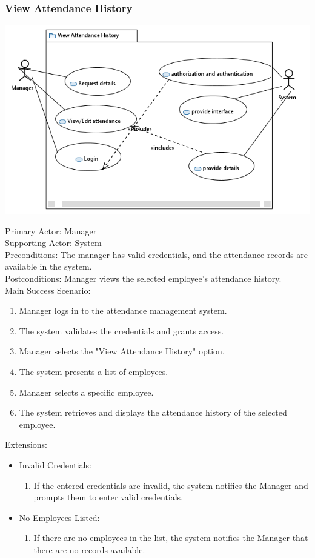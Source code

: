 \documentclass[a4paper, 12pt]{article}
\begin{document}
\subsubsection{View Attendance History}
\begin{center}
\includegraphics[width=1\textwidth]{View_Attendance_History_Use_Case.PNG}\par
\end{center}
Primary Actor: Manager\\
Supporting Actor: System\\
Preconditions: The manager has valid credentials, and the attendance records are available in the system.\\
Postconditions: Manager views the selected employee's attendance history.\\
\newpage
Main Success Scenario:
\begin{enumerate}
    \item Manager logs in to the attendance management system.
    \item The system validates the credentials and grants access.
    \item Manager selects the "View Attendance History" option.
    \item The system presents a list of employees.
    \item Manager selects a specific employee.
    \item The system retrieves and displays the attendance history of the selected employee.
\end{enumerate}
Extensions:
\begin{itemize}
    \item Invalid Credentials:
    \begin{enumerate}
        \item If the entered credentials are invalid, the system notifies the Manager and prompts them to enter valid credentials.
    \end{enumerate}
    \item No Employees Listed:
    \begin{enumerate}
        \item If there are no employees in the list, the system notifies the Manager that there are no records available.
    \end{enumerate}
\end{itemize}
\end{document}
